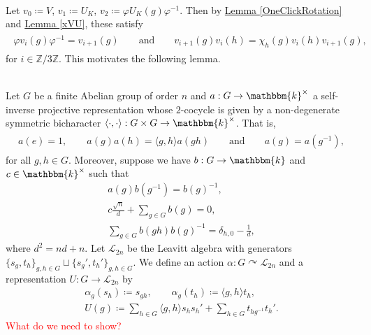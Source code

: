 \newpage

\noindent\\ Let $v_0 \coloneqq V$, $v_1 \coloneqq U_K$, $v_2 \coloneqq \varphi U_K(g) \varphi^{-1}$. Then by \hyperref[OneClickRotation]{Lemma \ref*{OneClickRotation}} and \hyperref[xVU]{Lemma \ref*{xVU}}, these satisfy
\begin{align*}
\begin{split}
\varphi v_i(g) \varphi^{-1} = v_{i+1}(g)\qquad\text{and}\qquad v_{i+1}(g)v_i(h) = \chi_h(g) v_i(h)v_{i+1}(g),
\end{split}
\end{align*}
\noindent for $i \in \mathbb{Z}/3\mathbb{Z}$. This motivates the following lemma.\\

\noindent\begin{lemma} 
\end{lemma}

\newpage

\noindent\\ Let $G$ be a finite Abelian group of order $n$ and $a : G \to \mathbbm{k}^\times$ a self-inverse projective representation whose $2$-cocycle is given by a non-degenerate symmetric bicharacter $\langle\cdot, \cdot\rangle : G \times G \to \mathbbm{k}^\times$. That is,
\begin{align*}
\begin{split}
a(e) = 1,\qquad a(g)a(h) = \langle g, h\rangle a(gh)\qquad\text{and}\qquad a(g) = a(g^{-1}),
\end{split}
\end{align*}
\noindent for all $g, h \in G$. Moreover, suppose we have $b : G \to \mathbbm{k}$ and $c \in \mathbbm{k}^\times$ such that
\begin{gather*}
a(g)b(g^{-1}) = b(g)^{-1},\\
c\frac{\sqrt{n}}{d} + \sum_{g \in G}b(g) = 0,\\
\sum_{g \in G}b(gh)b(g)^{-1} = \delta_{h,0} - \frac{1}{d},
\end{gather*}
\noindent where $d^2 = nd + n$. Let $\mathcal{L}_{2n}$ be the Leavitt algebra with generators $\{s_g, t_h\}_{g,h \in G} \sqcup \{s_g', t_h'\}_{g,h \in G}$. We define an action $\alpha : G \curvearrowright \mathcal{L}_{2n}$ and a representation $U : G \to \mathcal{L}_{2n}$ by
\begin{gather*}
\alpha_g(s_h) \coloneqq s_{gh},\qquad \alpha_g(t_h) \coloneqq \langle g, h\rangle t_h,\\
U(g) \coloneqq \sum_{h \in G}\langle g, h\rangle s_hs_h' + \sum_{h \in G} t_{hg^{-1}}t_h'.
\end{gather*}
\noindent\textcolor{red}{What do we need to show?}

